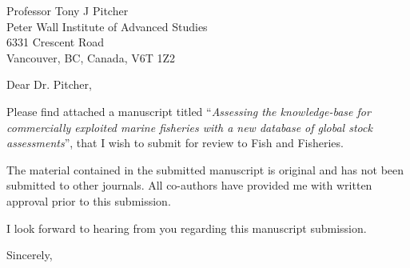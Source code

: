 \documentclass[letterpaper,12pt]{letter}
\begin{document}
\begin{letter}
{Professor Tony J Pitcher\\Peter Wall Institute of Advanced Studies\\6331 Crescent Road\\Vancouver, BC, Canada, V6T 1Z2}

\opening{Dear Dr. Pitcher,}
Please find attached a manuscript titled ``\textit{Assessing the knowledge-base for commercially exploited marine fisheries with a new database of global stock assessments}'', that I wish to submit for review to Fish and Fisheries. 
 
The material contained in the submitted manuscript is original and has not been submitted to other journals. All co-authors have provided me with written approval prior to this submission.

I look forward to hearing from you regarding this manuscript submission.

\closing{Sincerely,}

\end{letter}
\end{document}
